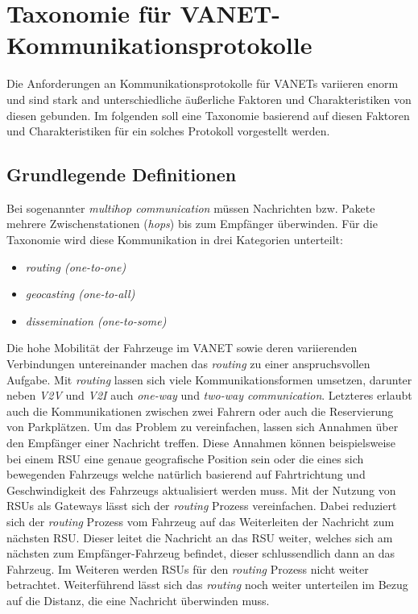 \documentclass[english,runningheads,a4paper]{llncs}[2018/03/10]
\begin{document}
\section{Taxonomie für VANET-Kommunikationsprotokolle}
\label{sec:taxcommunicationprotocol}
Die Anforderungen an Kommunikationsprotokolle für VANETs variieren enorm und sind stark and unterschiedliche äußerliche Faktoren und Charakteristiken von diesen gebunden.
Im folgenden soll eine Taxonomie basierend auf diesen Faktoren und Charakteristiken für ein solches Protokoll vorgestellt werden.

\subsection{Grundlegende Definitionen}
Bei sogenannter \textit{multihop communication} müssen Nachrichten bzw. Pakete mehrere Zwischenstationen (\textit{hops}) bis zum Empfänger überwinden.
Für die Taxonomie wird diese Kommunikation in drei Kategorien unterteilt:
\begin{itemize}
  \item \textit{routing (one-to-one)}
  \item \textit{geocasting (one-to-all)}
  \item \textit{dissemination (one-to-some)}
\end{itemize}
Die hohe Mobilität der Fahrzeuge im VANET sowie deren variierenden Verbindungen untereinander machen das \textit{routing} zu einer anspruchsvollen Aufgabe.
Mit \textit{routing} lassen sich viele Kommunikationsformen umsetzen, darunter neben \textit{V2V} und \textit{V2I} auch \textit{one-way} und \textit{two-way communication}.
Letzteres erlaubt auch die Kommunikationen zwischen zwei Fahrern oder auch die Reservierung von Parkplätzen.
Um das Problem zu vereinfachen, lassen sich Annahmen über den Empfänger einer Nachricht treffen.
Diese Annahmen können beispielsweise bei einem RSU eine genaue geografische Position sein oder die eines sich bewegenden Fahrzeugs welche natürlich basierend auf Fahrtrichtung und Geschwindigkeit des Fahrzeugs aktualisiert werden muss.
Mit der Nutzung von RSUs als Gateways lässt sich der \textit{routing} Prozess vereinfachen.
Dabei reduziert sich der \textit{routing} Prozess vom Fahrzeug auf das Weiterleiten der Nachricht zum nächsten RSU\@.
Dieser leitet die Nachricht an das RSU weiter, welches sich am nächsten zum Empfänger-Fahrzeug befindet, dieser schlussendlich dann an das Fahrzeug.
Im Weiteren werden RSUs für den \textit{routing} Prozess nicht weiter betrachtet.
Weiterführend lässt sich das \textit{routing} noch weiter unterteilen im Bezug auf die Distanz, die eine Nachricht überwinden muss.
\end{document}
